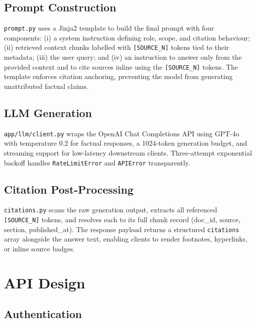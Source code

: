 \documentclass[10pt,a4paper,twocolumn]{article}
\begin{document}
\subsection{Prompt Construction}

\texttt{prompt.py} uses a Jinja2 template to build the final prompt with four components:
(i) a system instruction defining role, scope, and citation behaviour; (ii) retrieved context
chunks labelled with \texttt{[SOURCE\_N]} tokens tied to their metadata; (iii) the user
query; and (iv) an instruction to answer only from the provided context and to cite sources
inline using the \texttt{[SOURCE\_N]} tokens. The template enforces citation anchoring,
preventing the model from generating unattributed factual claims.

\subsection{LLM Generation}

\texttt{app/llm/client.py} wraps the OpenAI Chat Completions API using GPT-4o with
temperature 0.2 for factual responses, a 1024-token generation budget, and streaming
support for low-latency downstream clients. Three-attempt exponential backoff handles
\texttt{RateLimitError} and \texttt{APIError} transparently.

\subsection{Citation Post-Processing}

\texttt{citations.py} scans the raw generation output, extracts all referenced
\texttt{[SOURCE\_N]} tokens, and resolves each to its full chunk record (doc\_id, source,
section, published\_at). The response payload returns a structured \texttt{citations} array
alongside the answer text, enabling clients to render footnotes, hyperlinks, or inline
source badges.

\section{API Design}

\subsection{Authentication}
\end{document}
